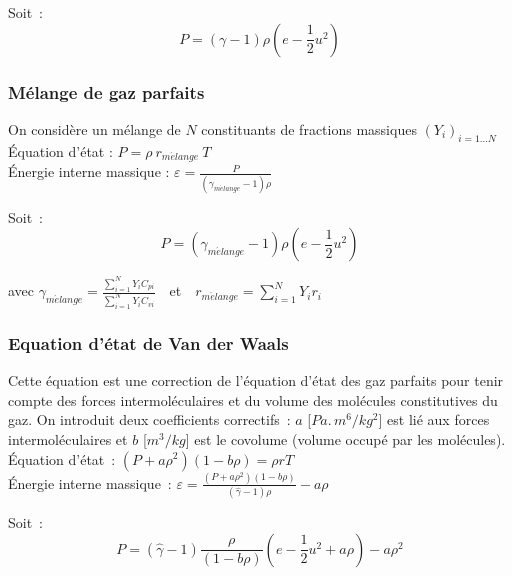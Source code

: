 Soit~:
\begin{equation}\label{Cfbl_Cfbase_eq_pression_gp_cfbase}
P = (\gamma -1) \rho (e - \frac{1}{2} u^2)
\end{equation}


\subsubsection*{Mélange de gaz parfaits}

On considère un mélange de $N$ constituants de fractions massiques
$(Y_i)_{i=1 \ldots N}$\\

Équation d'état : $P = \rho\ r_{m\acute elange}\ T$\\

Énergie interne massique :
$\varepsilon = \displaystyle\frac{P}{(\gamma_{m\acute elange} -1)\rho}$

Soit~:
\begin{equation}\label{Cfbl_Cfbase_eq_pression_melange_gp_cfbase}
P = (\gamma_{m\acute elange} -1) \rho (e - \frac{1}{2} u^2)
\end{equation}

avec $\gamma_{m\acute elange}
= \displaystyle\frac{\sum\limits_{i=1}^{N} {Y_i C_{pi}}}
{\sum\limits_{i=1}^{N} {Y_i C_{vi}}}$\ \
et\ \ $r_{m\acute elange} = \displaystyle\sum\limits_{i=1}^{N} {Y_i r_i}$


\subsubsection*{Equation d'état de Van der Waals}

Cette équation est une correction de l'équation d'état
des gaz parfaits pour tenir compte des forces intermoléculaires
et du volume des molécules constitutives du gaz.
On introduit deux coefficients correctifs~:
$a$ [$Pa.\,m^6 / kg^2$] est lié aux forces intermoléculaires
et $b$ [$m^3/kg$] est le covolume (volume occupé par les molécules).\\

Équation d'état~: $(P+a\rho^2)(1-b\rho) = \rho r T$\\

Énergie interne massique~:
$\varepsilon = \displaystyle\frac{(P+a\rho^2)(1-b\rho)}
{(\hat{\gamma} -1)\rho} - a \rho$

Soit~:
\begin{equation}\label{Cfbl_Cfbase_eq_pression_vdw_cfbase}
P = (\hat{\gamma} -1) \displaystyle\frac{\rho}{(1-b\rho)}
(e - \frac{1}{2} u^2 + a\rho) - a \rho^2
\end{equation}

